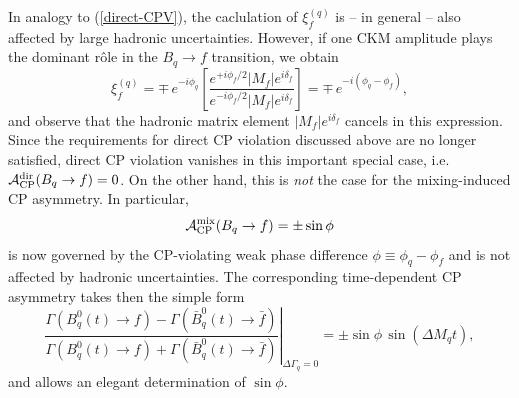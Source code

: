 \documentclass[11pt]{cernrep}
\begin{document}
In analogy to (\ref{direct-CPV}), the caclulation
of $\xi_f^{(q)}$ is -- in general -- also affected by large hadronic uncertainties. 
However, if one CKM amplitude plays the dominant r\^ole in the $B_q\to f$
transition, we obtain
\begin{equation}\label{xi-si}
\xi_f^{(q)}=\mp\, e^{-i\phi_q}\left[
\frac{e^{+i\phi_f/2}|M_f|e^{i\delta_f}}{e^{-i\phi_f/2}|M_f|e^{i\delta_f}}
\right]=\mp\, e^{-i(\phi_q-\phi_f)},
\end{equation}
and observe that the hadronic matrix element $|M_f|e^{i\delta_f}$ 
cancels in this expression. Since the requirements for 
direct CP violation discussed above are no longer satisfied, direct CP violation 
vanishes in this important special case, i.e.\ 
${\cal A}^{\mbox{{\scriptsize dir}}}_{\mbox{{\scriptsize CP}}}
(B_q\to f)=0$. On the other hand, this is {\it not} the case for the mixing-induced 
CP asymmetry. In particular, 
\begin{equation}\label{Amix-simple}
{\cal A}^{\rm mix}_{\rm CP}(B_q\to f)=\pm\sin\phi
\end{equation}
is now governed by the CP-violating weak phase difference 
$\phi\equiv\phi_q-\phi_f$ and is not affected by hadronic 
uncertainties. The corresponding time-dependent CP asymmetry
takes then the simple form
\begin{equation}\label{Amix-t-simple}
\left.\frac{\Gamma(B^0_q(t)\to f)-
\Gamma(\bar B^0_q(t)\to \bar f)}{\Gamma(B^0_q(t)\to f)+
\Gamma(\bar B^0_q(t)\to \bar f)}\right|_{\Delta\Gamma_q=0}
=\pm\sin\phi\,\sin(\Delta M_q t),
\end{equation}
and allows an elegant determination of $\sin\phi$.


%
%
%
\end{document}
